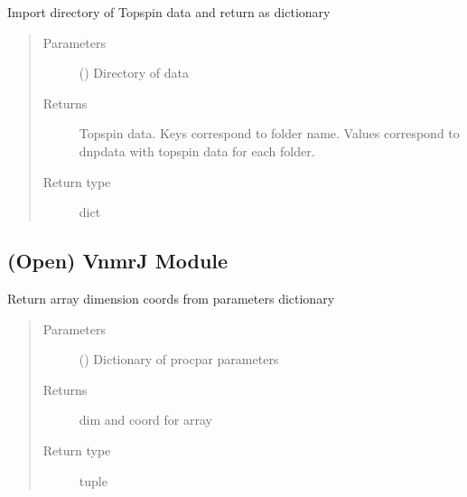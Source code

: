 \documentclass[letterpaper,10pt,english]{sphinxmanual}
\begin{document}
\begin{fulllineitems}
\label{\detokenize{dnpImport:dnpLab.dnpImport.topspin.import_topspin_dir}}
Import directory of Topspin data and return as dictionary
\begin{quote}\begin{description}
\item[{Parameters}] \leavevmode
{} () \sphinxhyphen{}\sphinxhyphen{} Directory of data

\item[{Returns}] \leavevmode
Topspin data. Keys correspond to folder name. Values correspond to dnpdata with topspin data for each folder.

\item[{Return type}] \leavevmode
dict

\end{description}\end{quote}

\end{fulllineitems}



\subsection{(Open) VnmrJ Module}
\label{\detokenize{dnpImport:module-dnpLab.dnpImport.vnmrj}}\label{\detokenize{dnpImport:open-vnmrj-module}}\label{\detokenize{dnpImport:vnmrj}}

\begin{fulllineitems}
\label{\detokenize{dnpImport:dnpLab.dnpImport.vnmrj.array_coords}}
Return array dimension coords from parameters dictionary
\begin{quote}\begin{description}
\item[{Parameters}] \leavevmode
{} () \sphinxhyphen{}\sphinxhyphen{} Dictionary of procpar parameters

\item[{Returns}] \leavevmode
dim and coord for array

\item[{Return type}] \leavevmode
tuple

\end{description}\end{quote}

\end{fulllineitems}
\end{document}
